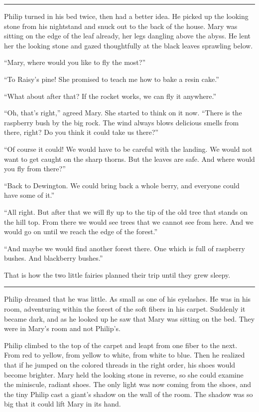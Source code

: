 \documentclass[10pt, draft]{memoir}
\renewcommand{\pfbreakdisplay}{\bigskip \ding{166} \bigskip}
\newcommand{\secbreak}{\fancybreak{\pfbreakdisplay}}
\begin{document}
\secbreak

Philip turned in his bed twice, then had a better idea. He picked up the looking stone from his nightstand and snuck out to the back of the house. Mary was sitting on the edge of the leaf already, her legs dangling above the abyss. He lent her the looking stone and gazed thoughtfully at the black leaves sprawling below.

``Mary, where would you like to fly the most?''

``To Raisy's pine! She promised to teach me how to bake a resin cake.''

``What about after that? If the rocket works, we can fly it anywhere.''

``Oh, that's right,'' agreed Mary. She started to think on it now. ``There is the raspberry bush by the big rock. The wind always blows delicious smells from there, right? Do you think it could take us there?''

``Of course it could! We would have to be careful with the landing. We would not want to get caught on the sharp thorns. But the leaves are safe. And where would you fly from there?''

``Back to Dewington. We could bring back a whole berry, and everyone could have some of it.''

``All right. But after that we will fly up to the tip of the old tree that stands on the hill top. From there we would see trees that we cannot see from here. And we would go on until we reach the edge of the forest.''

``And maybe we would find another forest there. One which is full of raspberry bushes. And blackberry bushes.''

That is how the two little fairies planned their trip until they grew sleepy.

\secbreak

Philip dreamed that he was little. As small as one of his eyelashes. He was in his room, adventuring within the forest of the soft fibers in his carpet. Suddenly it became dark, and as he looked up he saw that Mary was sitting on the bed. They were in Mary's room and not Philip's.

Philip climbed to the top of the carpet and leapt from one fiber to the next. From red to yellow, from yellow to white, from white to blue. Then he realized that if he jumped on the colored threads in the right order, his shoes would become brighter. Mary held the looking stone in reverse, so she could examine the miniscule, radiant shoes. The only light was now coming from the shoes, and the tiny Philip cast a giant's shadow on the wall of the room. The shadow was so big that it could lift Mary in its hand.
\end{document}
